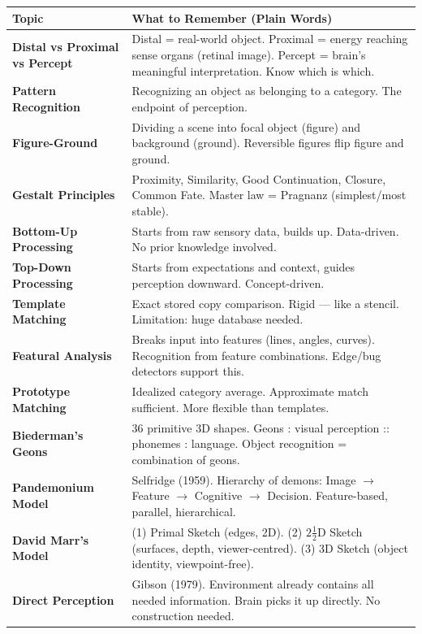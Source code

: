 \documentclass[11pt,a4paper]{article}
\newcommand{\bb}[1]{\textbf{#1}}
\begin{document}
\begin{center}
\renewcommand{\arraystretch}{1.4}
\begin{tabular}{|L{3.2cm}|L{12cm}|}
\hline
{}\color{white}\bb{Topic} & \color{white}\bb{What to Remember (Plain Words)} \\
\hline
\bb{Distal vs Proximal vs Percept} & Distal = real-world object. Proximal = energy reaching sense organs (retinal image). Percept = brain's meaningful interpretation. Know which is which. \\
\bb{Pattern Recognition} & Recognizing an object as belonging to a category. The endpoint of perception. \\
\bb{Figure-Ground} & Dividing a scene into focal object (figure) and background (ground). Reversible figures flip figure and ground. \\
\bb{Gestalt Principles} & Proximity, Similarity, Good Continuation, Closure, Common Fate. Master law = Pragnanz (simplest/most stable). \\
\bb{Bottom-Up Processing} & Starts from raw sensory data, builds up. Data-driven. No prior knowledge involved. \\
\bb{Top-Down Processing} & Starts from expectations and context, guides perception downward. Concept-driven. \\
\bb{Template Matching} & Exact stored copy comparison. Rigid --- like a stencil. Limitation: huge database needed. \\
\bb{Featural Analysis} & Breaks input into features (lines, angles, curves). Recognition from feature combinations. Edge/bug detectors support this. \\
\bb{Prototype Matching} & Idealized category average. Approximate match sufficient. More flexible than templates. \\
\bb{Biederman's Geons} & 36 primitive 3D shapes. Geons : visual perception :: phonemes : language. Object recognition = combination of geons. \\
\bb{Pandemonium Model} & Selfridge (1959). Hierarchy of demons: Image $\to$ Feature $\to$ Cognitive $\to$ Decision. Feature-based, parallel, hierarchical. \\
\bb{David Marr's Model} & (1) Primal Sketch (edges, 2D). (2) $2\tfrac{1}{2}$D Sketch (surfaces, depth, viewer-centred). (3) 3D Sketch (object identity, viewpoint-free). \\
\bb{Direct Perception} & Gibson (1979). Environment already contains all needed information. Brain picks it up directly. No construction needed. \\

\end{tabular}
\end{center}
\end{document}
